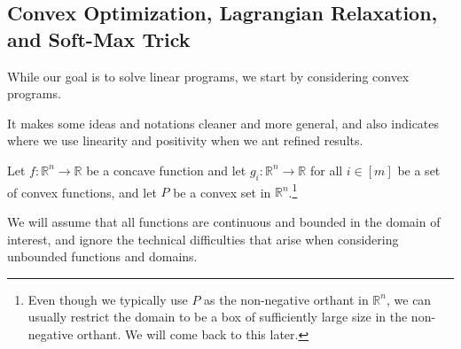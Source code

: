 \subsection{Convex Optimization, Lagrangian Relaxation, and Soft-Max Trick}
While our goal is to solve linear programs, we start by considering convex programs.

\begin{intuition}
	It makes some ideas and notations cleaner and more general, and also indicates where we use linearity and positivity when we ant refined results.
\end{intuition}

Let \(f \colon \mathbb{R} ^n \to \mathbb{R} \) be a concave function and let \(g_i \colon \mathbb{R} ^n \to \mathbb{R} \) for all \(i \in [m]\) be a set of convex functions, and let \(P\) be a convex set in \(\mathbb{R} ^n\).\footnote{Even though we typically use \(P\) as the non-negative orthant in \(\mathbb{R} ^n\), we can usually restrict the domain to be a box of sufficiently large size in the non-negative orthant. We will come back to this later.}

\begin{note}
	We will assume that all functions are continuous and bounded in the domain of interest, and ignore the technical difficulties that arise when considering unbounded functions and domains.
\end{note}

